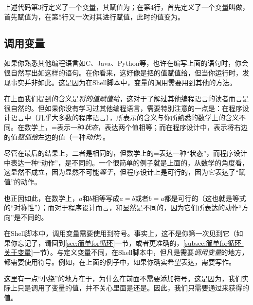 上述代码第3行定义了一个变量，其赋值为；在第4行，首先定义了一个变量叫做，首先赋值为，在第5行又一次对其进行赋值，此时的值变为。

\subsection{调用变量}\label{subsec:变量-调用变量}

如果你熟悉其他编程语言如C、Java、Python等，也许在编写上面的语句时，你会很自然写出如这样的语句。在你看来，这好像是把的值赋值给，但当你运行时，发现事实并非如此。这是因为在Shell脚本中，变量的调用需要用到其他的方法。

\begin{attention}
    在上面我们提到的含义是\emph{将的值赋值给}，这对于了解过其他编程语言的读者而言是很自然的。但如果你没有学习过其他编程语言，需要特别注意的一点是：在程序设计语言中（几乎大多数的程序语言），\code{=}所表示的含义与你所熟悉的数学上的含义不同。在数学上，=表示一种\emph{状态}，表达两个值相等；而在程序设计中，\code{=}表示将右边的值\emph{赋值给}左边的值（一种\emph{动作}）。

    尽管在最后的结果上，二者是相同的，但数学上的=表达一种“状态”，而程序设计中表达一种“动作”，是不同的。一个很简单的例子就是上面的，从数学的角度看，这显然不成立，因为显然不可能\emph{等于}，但程序设计上是可行的，因为它表达了“赋值”的动作。

    也正因如此，在数学上，$a$和$b$相等写成$a=b$或者$b=a$都是可行的（这也就是等式的“对称性”）；而对于程序设计而言，和显然是不同的，因为它们所表达的动作“方向”是不同的。
\end{attention}

在Shell脚本中，调用变量需要使用到\keyword{\$}符号。事实上，这不是你第一次见到它（如果你忘记了，请回到\ref{sec:简单for循环}一节，或者更准确的，\ref{subsec:简单for循环-关于变量}一节）。与定义变量不同，在Shell脚本中，但凡是需要\emph{调用变量}的地方，都需要使用\code{\$}符号。例如，在上面的例子中，如果你确实希望表达，需要写作。

这里有一点“小绕”的地方在于，为什么在前面不需要添加\code{\$}符号。这是因为，我们实际上只是调用了变量的值，并不关心里面是还是。因此，我们只需要通过来获得的值。

